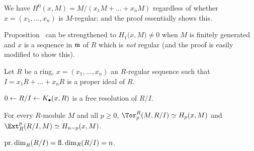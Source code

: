 \documentclass[a4paper,parskip=half,numbers=enddot, DIV=12]{scrreprt}
\begin{document}
\begin{rem*}
	\begin{alphanumerate}
		\item We have $H^0(x,M)=M/(x_1M+\ldots+x_nM)$ regardless of whether $x=(x_1,\ldots,x_n)$ is $M$-regular; and the proof essentially shows this.
		\item Proposition~ can be strengthened to $H_1\big(x,M\big)\neq 0$ when $M$ is finitely generated and $x$ is a sequence in $\mathfrak{m}$ of $R$ which is \emph{not} regular (and the proof is easily modified to show this).
	\end{alphanumerate}
\end{rem*}
\begin{fact}
	Let $R$ be a ring, $x=(x_1,\ldots,x_n)$ an $R$-regular sequence such that $I=x_1R+\ldots+x_nR$ is a proper ideal of $R$.
	\begin{alphanumerate}
		\item $0\lmorphism R/I\lmorphism K_\bullet(x,R)$ is a free resolution of $R/I$.
		\item For every $R$-module $M$ and all $p\geq 0$, $\Tor_p^R(M,R/I)\simeq H_p(x,M)$ and  $\Ext_R^p(R/I,M)\simeq H_{n-p}(x,M)$.
		\item $\operatorname{pr.dim}_R(R/I)=\operatorname{fl.dim}_R(R/I)= n$.
	\end{alphanumerate}
\end{fact}
\end{document}
